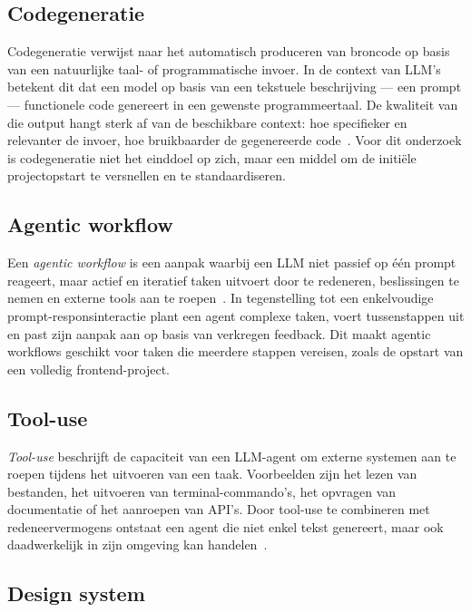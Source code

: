 \subsection{Codegeneratie}
\label{subsec:codegeneratie}

Codegeneratie verwijst naar het automatisch produceren van broncode op basis van een natuurlijke taal- of programmatische invoer. In de context van LLM's betekent dit dat een model op basis van een tekstuele beschrijving --- een prompt --- functionele code genereert in een gewenste programmeertaal. De kwaliteit van die output hangt sterk af van de beschikbare context: hoe specifieker en relevanter de invoer, hoe bruikbaarder de gegenereerde code~\autocite{Sergeyuk2024}. Voor dit onderzoek is codegeneratie niet het einddoel op zich, maar een middel om de initiële projectopstart te versnellen en te standaardiseren.

\subsection{Agentic workflow}
\label{subsec:agentic-workflow}

Een \textit{agentic workflow} is een aanpak waarbij een LLM niet passief op één prompt reageert, maar actief en iteratief taken uitvoert door te redeneren, beslissingen te nemen en externe tools aan te roepen~\autocite{Rao2025,YaoReAct2022}. In tegenstelling tot een enkelvoudige prompt-responsinteractie plant een agent complexe taken, voert tussenstappen uit en past zijn aanpak aan op basis van verkregen feedback. Dit maakt agentic workflows geschikt voor taken die meerdere stappen vereisen, zoals de opstart van een volledig frontend-project.

\subsection{Tool-use}
\label{subsec:tool-use}

\textit{Tool-use} beschrijft de capaciteit van een LLM-agent om externe systemen aan te roepen tijdens het uitvoeren van een taak. Voorbeelden zijn het lezen van bestanden, het uitvoeren van terminal-commando's, het opvragen van documentatie of het aanroepen van API's. Door tool-use te combineren met redeneervermogens ontstaat een agent die niet enkel tekst genereert, maar ook daadwerkelijk in zijn omgeving kan handelen~\autocite{Rao2025}.

\subsection{Design system}
\label{subsec:design-system}

